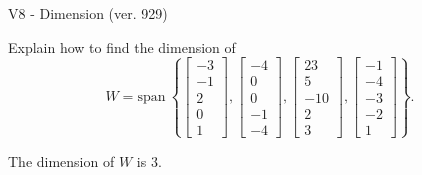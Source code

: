 \begin{exercise}
  \begin{exerciseTitle}V8 - Dimension (ver. 929)\end{exerciseTitle}
  \begin{exerciseStatement}
    Explain how to find the dimension of 
\[W=\mathrm{span}\ \left\{\left[\begin{array}{r}
-3 \\
-1 \\
2 \\
0 \\
1
\end{array}\right] , \left[\begin{array}{r}
-4 \\
0 \\
0 \\
-1 \\
-4
\end{array}\right] , \left[\begin{array}{r}
23 \\
5 \\
-10 \\
2 \\
3
\end{array}\right] , \left[\begin{array}{r}
-1 \\
-4 \\
-3 \\
-2 \\
1
\end{array}\right]\right\}.\]



  \end{exerciseStatement}
  \begin{exerciseAnswer}
   The dimension of \(W\) is  \(3\).
  


  \end{exerciseAnswer}
\end{exercise}